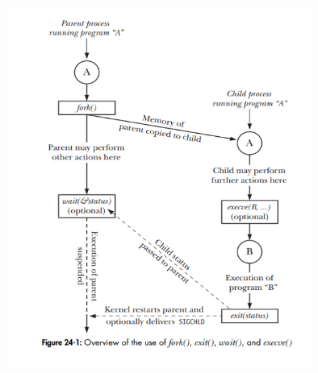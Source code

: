 \documentclass{article}
\begin{document}
\begin{figure}[h]
    \begin{center}
    \includegraphics[width=10cm]{31.png}
    \end{center}
    \end{figure}
\end{document}

